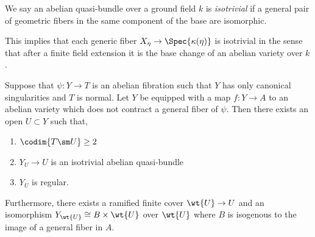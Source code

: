 \documentclass[12pt]{article}
\begin{document}
\begin{defn}
We say an abelian quasi-bundle over a ground field $k$ is \textit{isotrivial} if a general pair of geometric fibers in the same component of the base are isomorphic. 
\end{defn}

\begin{rmk}
This implies that each generic fiber $X_{\eta} \to \Spec{\kappa(\eta)}$ is isotrivial in the sense that after a finite field extension it is the base change of an abelian variety over $k$.
\end{rmk}

\begin{thm} \label{splitting_result}
Suppose that $\psi : Y \to T$ is an abelian fibration such that $Y$ has only canonical singularities and $T$ is normal. Let $Y$ be equipped with a map $f : Y \to A$ to an abelian variety which does not contract a general fiber of $\psi$. Then there exists an open $U \subset Y$ such that,
\begin{enumerate}
\item $\codim{T \sm U} \ge 2$
\item $Y_U \to U$ is an isotrivial abelian quasi-bundle 
\item $Y_U$ is regular.
\end{enumerate}
Furthermore, there exists a ramified finite cover $\wt{U} \to U$ and an isomorphism $Y_{\wt{U}} \cong B \times \wt{U}$ over $\wt{U}$
where $B$ is isogenous to the image of a general fiber in $A$.
\end{thm}
\end{document}
